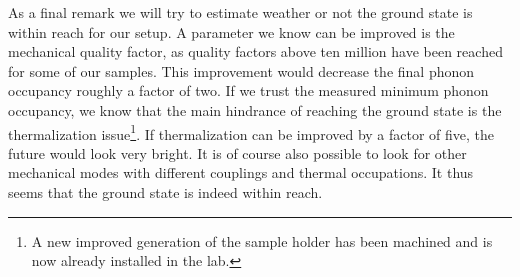 As a final remark we will try to estimate weather or not the ground state is within reach for our setup. A parameter we know can be improved is the mechanical quality factor, as quality factors above ten million have been reached for some of our samples. This improvement would decrease the final phonon occupancy roughly a factor of two. If we trust the measured minimum phonon occupancy, we know that the main hindrance of reaching the ground state is the thermalization issue\footnote{A new improved generation of the sample holder has been machined and is now already installed in the lab.}. If thermalization can be improved by a factor of five, the future would look very bright. It is of course also possible to look for other mechanical modes with different couplings and thermal occupations. It thus seems that the ground state is indeed within reach.